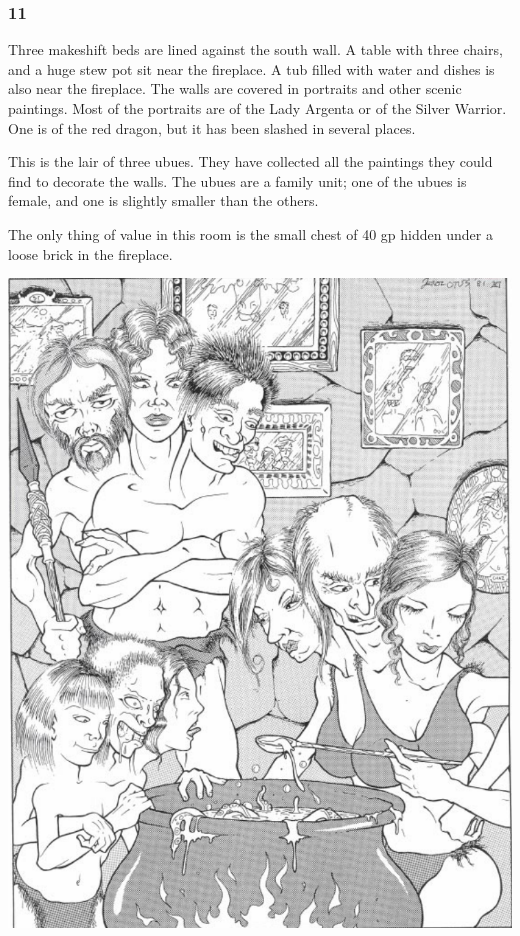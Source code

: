 \documentclass[palace_of_the_silver_princess]{subfiles}
\begin{document}
\subsubsection{11}
\begin{quotebox}
    Three makeshift beds are lined against the south wall. A table with
    three chairs, and a huge stew pot sit near the fireplace. A tub
    filled with water and dishes is also near the fireplace. The walls
    are covered in portraits and other scenic paintings. Most of the
    portraits are of the Lady Argenta or of the Silver Warrior. One is
    of the red dragon, but it has been slashed in several places.
\end{quotebox}

This is the lair of three ubues. They have collected all the paintings
they could find to decorate the walls. The ubues are a family unit; one
of the ubues is female, and one is slightly smaller than the others.

The only thing of value in this room is the small chest of 40 gp hidden
under a loose brick in the fireplace.

\includegraphics[width=\columnwidth]{img/ubues.png}
\end{document}
